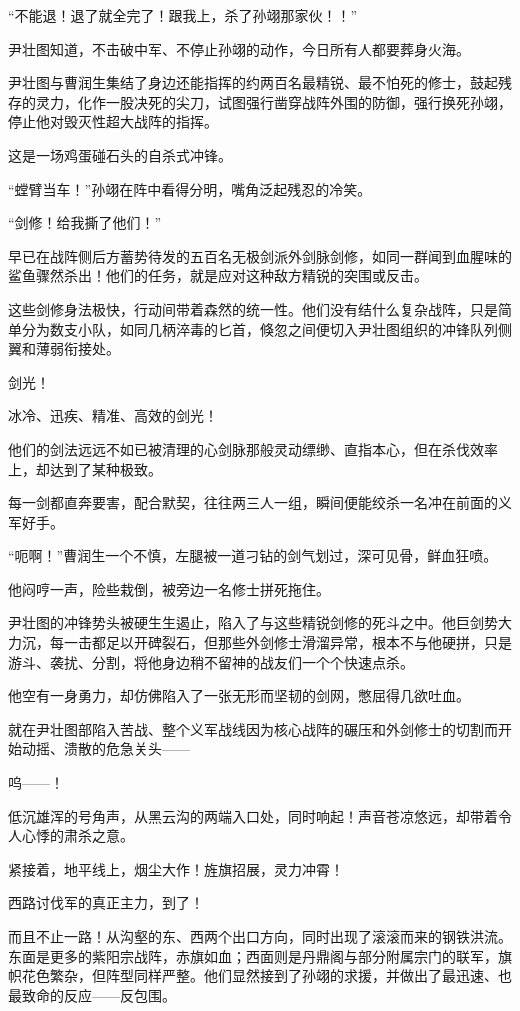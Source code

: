 “不能退！退了就全完了！跟我上，杀了孙翊那家伙！！”

尹壮图知道，不击破中军、不停止孙翊的动作，今日所有人都要葬身火海。

尹壮图与曹润生集结了身边还能指挥的约两百名最精锐、最不怕死的修士，鼓起残存的灵力，化作一股决死的尖刀，试图强行凿穿战阵外围的防御，强行换死孙翊，停止他对毁灭性超大战阵的指挥。

这是一场鸡蛋碰石头的自杀式冲锋。

“螳臂当车！”孙翊在阵中看得分明，嘴角泛起残忍的冷笑。

“剑修！给我撕了他们！”

早已在战阵侧后方蓄势待发的五百名无极剑派外剑脉剑修，如同一群闻到血腥味的鲨鱼骤然杀出！他们的任务，就是应对这种敌方精锐的突围或反击。

这些剑修身法极快，行动间带着森然的统一性。他们没有结什么复杂战阵，只是简单分为数支小队，如同几柄淬毒的匕首，倏忽之间便切入尹壮图组织的冲锋队列侧翼和薄弱衔接处。

剑光！

冰冷、迅疾、精准、高效的剑光！

他们的剑法远远不如已被清理的心剑脉那般灵动缥缈、直指本心，但在杀伐效率上，却达到了某种极致。

每一剑都直奔要害，配合默契，往往两三人一组，瞬间便能绞杀一名冲在前面的义军好手。

“呃啊！”曹润生一个不慎，左腿被一道刁钻的剑气划过，深可见骨，鲜血狂喷。

他闷哼一声，险些栽倒，被旁边一名修士拼死拖住。

尹壮图的冲锋势头被硬生生遏止，陷入了与这些精锐剑修的死斗之中。他巨剑势大力沉，每一击都足以开碑裂石，但那些外剑修士滑溜异常，根本不与他硬拼，只是游斗、袭扰、分割，将他身边稍不留神的战友们一个个快速点杀。

他空有一身勇力，却仿佛陷入了一张无形而坚韧的剑网，憋屈得几欲吐血。

就在尹壮图部陷入苦战、整个义军战线因为核心战阵的碾压和外剑修士的切割而开始动摇、溃散的危急关头——

呜——！

低沉雄浑的号角声，从黑云沟的两端入口处，同时响起！声音苍凉悠远，却带着令人心悸的肃杀之意。

紧接着，地平线上，烟尘大作！旌旗招展，灵力冲霄！

西路讨伐军的真正主力，到了！

而且不止一路！从沟壑的东、西两个出口方向，同时出现了滚滚而来的钢铁洪流。东面是更多的紫阳宗战阵，赤旗如血；西面则是丹鼎阁与部分附属宗门的联军，旗帜花色繁杂，但阵型同样严整。他们显然接到了孙翊的求援，并做出了最迅速、也最致命的反应——反包围。

